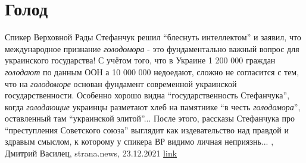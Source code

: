  
 
 
 
 
\chapter{Голод}
\label{sec:slova.golod}

Спикер Верховной Рады Стефанчук решил \enquote{блеснуть интеллектом} и заявил, что
международное признание \emph{голодомора} - это фундаментально важный вопрос для
украинского государства!  С учётом того, что в Украине 1 200 000 граждан
\emph{голодают} по данным ООН а 10 000 000 недоедают, сложно не согласится с тем, что
на \emph{голодоморе} основан фундамент современной украинской государственности.
Особенно хорошо видна \enquote{государственность Стефанчука}, когда \emph{голодающие} украинцы
разметают хлеб на памятнике \enquote{в честь \emph{голодомора}}, оставленный там \enquote{украинской
элитой}...  После этого, рассказы Стефанчука про \enquote{преступления Советского
союза} выглядит как издевательство над правдой и здравым смыслом, к которому у
спикера ВР видимо личная неприязнь...
, 
Дмитрий Василец, strana.news, 23.12.2021
\href{https://strana.news/opinions/368485-holodomor-i-pravda-fundamentalnaja-problema-sovremennoj-ukrainy.html}{link}

